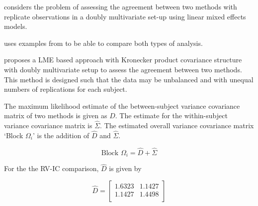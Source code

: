 \documentclass[12pt, a4paper]{report}
\theoremstyle{plain}
\theoremstyle{definition}
\theoremstyle{remark}
\begin{document}
%




















\citet{ARoy2009} considers the problem of assessing the agreement
between two methods with replicate observations in a doubly
multivariate set-up using linear mixed effects models.

\citet{ARoy2009} uses examples from \citet{BA86} to be able to
compare both types of analysis.

\citet{ARoy2009} proposes a LME based approach with Kronecker
product covariance structure with doubly multivariate setup to
assess the agreement between two methods. This method is designed
such that the data may be unbalanced and with unequal numbers of
replications for each subject.

The maximum likelihood estimate of the between-subject variance
covariance matrix of two methods is given as $D$. The estimate for
the within-subject variance covariance matrix is $\hat{\Sigma}$.
The estimated overall variance covariance matrix `Block
$\Omega_{i}$' is the addition of $\hat{D}$ and $\hat{\Sigma}$.


\begin{equation}
\mbox{Block  }\Omega_{i} = \hat{D} + \hat{\Sigma}
\end{equation}

For the the RV-IC comparison, $\hat{D}$ is given by


\begin{equation}
\hat{D}= \left[ \begin{array}{cc}
1.6323 & 1.1427  \\
1.1427 & 1.4498 \\
\end{array} \right]
\end{equation}
\end{document}
